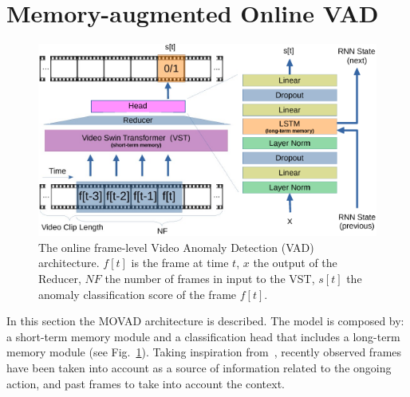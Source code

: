 \section{Memory-augmented Online VAD}
\label{sec:theory}

\fboxsep=1mm%
\fboxrule=1pt%

\begin{figure}[!t]
            \centerline{\includegraphics[clip, width=\linewidth]{images/arch-rx-cropped.pdf}}
        \caption{The online frame-level Video Anomaly Detection (VAD) architecture. $f[t]$ is the frame at time $t$, $x$ the output of the Reducer, $\mathit{NF}$ the number of frames in input to the VST, $s[t]$ the anomaly classification score of the frame $f[t]$.\label{fig:arch}}
\end{figure}

In this section the MOVAD architecture is described.  
The model is composed by: a short-term memory module and a classification head that includes a long-term memory module (see Fig.~\ref{fig:arch}). 
Taking inspiration from~\cite{xu2021long}, recently observed frames have been taken into account as a source of information related to the ongoing action, and past frames to take into account the context.

